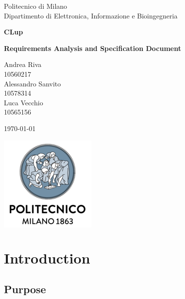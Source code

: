 \documentclass[10pt,english, openany]{book}
\begin{document}

\begin{titlepage}
	\clearpage\thispagestyle{empty}
	\centering
	\vspace{1cm}

	{\normalsize Politecnico di Milano\\
	             Dipartimento di Elettronica, Informazione e Bioingegneria \par}
		\vspace{2cm}
	{\Huge \textbf{CLup}
	} \\
	{\large \textbf{Requirements Analysis and Specification Document} \par}
	\vspace{4cm}
	{\normalsize Andrea Riva\\
	             10560217\\
	             Alessandro Sanvito\\ 
                 10578314\\
                 Luca Vecchio\\
                 10565156
                 \par}
	\vspace{5cm}
	
	{\normalsize \today \par}
	
	\vspace{0.5cm}
    
    \centering \includegraphics[scale=0.6]{logo1.png}
    
    
	\pagebreak

\end{titlepage}

\tableofcontents{}

\mainmatter

\chapter{Introduction}\label{chapt:sum}

\section{Purpose}



\pagebreak
\end{document}
